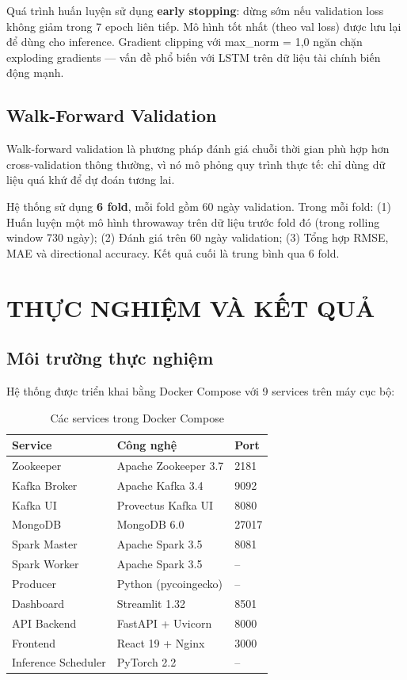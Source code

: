 \documentclass[12pt, a4paper]{report}
\begin{document}
Quá trình huấn luyện sử dụng \textbf{early stopping}: dừng sớm nếu validation loss
không giảm trong 7 epoch liên tiếp. Mô hình tốt nhất (theo val loss) được lưu lại
để dùng cho inference. Gradient clipping với max\_norm = 1,0 ngăn chặn exploding
gradients --- vấn đề phổ biến với LSTM trên dữ liệu tài chính biến động mạnh.

\section{Walk-Forward Validation}

Walk-forward validation \cite{ref9} là phương pháp đánh giá chuỗi thời gian phù hợp hơn
cross-validation thông thường, vì nó mô phỏng quy trình thực tế: chỉ dùng dữ liệu quá
khứ để dự đoán tương lai.

Hệ thống sử dụng \textbf{6 fold}, mỗi fold gồm 60 ngày validation. Trong mỗi fold:
(1) Huấn luyện một mô hình throwaway trên dữ liệu trước fold đó (trong rolling window
730 ngày); (2) Đánh giá trên 60 ngày validation; (3) Tổng hợp RMSE, MAE và directional
accuracy. Kết quả cuối là trung bình qua 6 fold.

\chapter{THỰC NGHIỆM VÀ KẾT QUẢ}

\section{Môi trường thực nghiệm}

Hệ thống được triển khai bằng Docker Compose với 9 services trên máy cục bộ:

\begin{table}[H]
  \centering
  \caption{Các services trong Docker Compose}
  \label{tab:services}
  \begin{tabular}{lll}
    \toprule
    Service & Công nghệ & Port \\
    \midrule
    Zookeeper & Apache Zookeeper 3.7 & 2181 \\
    Kafka Broker & Apache Kafka 3.4 & 9092 \\
    Kafka UI & Provectus Kafka UI & 8080 \\
    MongoDB & MongoDB 6.0 & 27017 \\
    Spark Master & Apache Spark 3.5 & 8081 \\
    Spark Worker & Apache Spark 3.5 & -- \\
    Producer & Python (pycoingecko) & -- \\
    Dashboard & Streamlit 1.32 & 8501 \\
    API Backend & FastAPI + Uvicorn & 8000 \\
    Frontend & React 19 + Nginx & 3000 \\
    Inference Scheduler & PyTorch 2.2 & -- \\
    \bottomrule
  \end{tabular}
\end{table}
\end{document}

